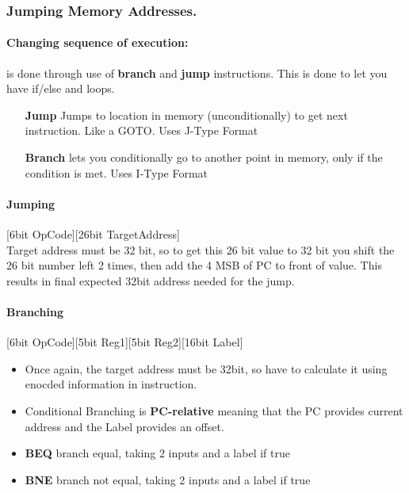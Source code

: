 \documentclass{article}
\newcommand\tab[1][0.5cm]{\hspace*{#1}}
\begin{document}
		\subsubsection*{Jumping Memory Addresses.}
			\paragraph{Changing sequence of execution: } is done through use of \textbf{branch} and \textbf{jump} instructions. This is done to let you have if/else and loops.
			\begin{enumerate}
				\item[\textbf{Jump}] Jumps to location in memory (unconditionally) to get next instruction. Like a GOTO. Uses J-Type Format
				\item[\textbf{Branch}] lets you conditionally go to another point in memory, only if the condition is met. Uses I-Type Format
			\end{enumerate}

			\paragraph{\tab Jumping} [6bit OpCode][26bit TargetAddress]\\ Target address must be 32 bit, so to get this 26 bit value to 32 bit you shift the 26 bit number left 2 times, then add the 4 MSB of PC to front of value. This results in final expected 32bit address needed for the jump.

			\paragraph{\tab Branching} [6bit OpCode][5bit Reg1][5bit Reg2][16bit Label]
			\begin{itemize}
				\item Once again, the target address must be 32bit, so have to calculate it using enocded information in instruction.
				\item Conditional Branching is \textbf{PC-relative} meaning that the PC provides current address and the Label provides an offset.
			\end{itemize}

			\begin{itemize}
				\item \textbf{BEQ} branch equal, taking 2 inputs and a label if true
				\item \textbf{BNE} branch not equal, taking 2 inputs and a label if true
			\end{itemize}
\end{document}
